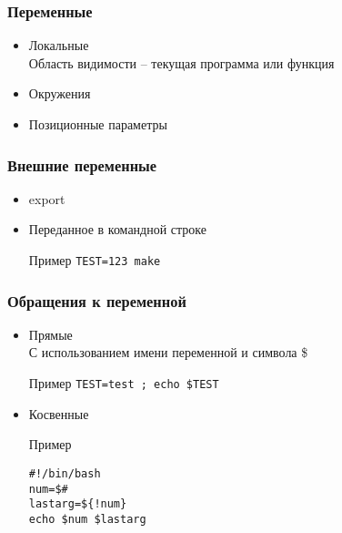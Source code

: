 

\begin{frame}
	\frametitle{Переменные}

	\large{}

	\begin{itemize}
		\item Локальные\\
		    Область видимости -- текущая программа или функция
		\item Окружения
		\item Позиционные параметры
	\end{itemize}

\end{frame}


\begin{frame}
	\frametitle{Внешние переменные}


	\begin{itemize}
		\item  export
		\item Переданное в командной строке \\
			\begin{block}{Пример}
				{\tt TEST=123 make}
			\end{block}
	\end{itemize}
\end{frame}


\begin{frame}[fragile]
	\frametitle{Обращения к переменной}

	\begin{itemize}
		\item Прямые \\
	    С использованием имени переменной и символа \$\\
			\begin{block}{Пример}
				{\tt TEST=test ; echo \$TEST}
			\end{block}
		\item Косвенные \\
			\begin{block}{Пример}
				\begin{lstlisting}
#!/bin/bash 
num=$# 
lastarg=${!num} 
echo $num $lastarg
				\end{lstlisting}
			\end{block}
	\end{itemize}


\end{frame}


